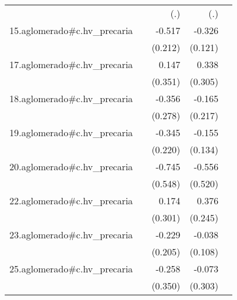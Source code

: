 {\begin{longtable}{l*{4}{D{.}{.}{-1}}}
            &                     &         (.)         &         (.)         &                     \\
\addlinespace
15.aglomerado#c.hv\_precaria&                     &      -0.517\sym{*}  &      -0.326\sym{**} &                     \\
            &                     &     (0.212)         &     (0.121)         &                     \\
\addlinespace
17.aglomerado#c.hv\_precaria&                     &       0.147         &       0.338         &                     \\
            &                     &     (0.351)         &     (0.305)         &                     \\
\addlinespace
18.aglomerado#c.hv\_precaria&                     &      -0.356         &      -0.165         &                     \\
            &                     &     (0.278)         &     (0.217)         &                     \\
\addlinespace
19.aglomerado#c.hv\_precaria&                     &      -0.345         &      -0.155         &                     \\
            &                     &     (0.220)         &     (0.134)         &                     \\
\addlinespace
20.aglomerado#c.hv\_precaria&                     &      -0.745         &      -0.556         &                     \\
            &                     &     (0.548)         &     (0.520)         &                     \\
\addlinespace
22.aglomerado#c.hv\_precaria&                     &       0.174         &       0.376         &                     \\
            &                     &     (0.301)         &     (0.245)         &                     \\
\addlinespace
23.aglomerado#c.hv\_precaria&                     &      -0.229         &      -0.038         &                     \\
            &                     &     (0.205)         &     (0.108)         &                     \\
\addlinespace
25.aglomerado#c.hv\_precaria&                     &      -0.258         &      -0.073         &                     \\
            &                     &     (0.350)         &     (0.303)         &                     \\

\end{longtable}}
